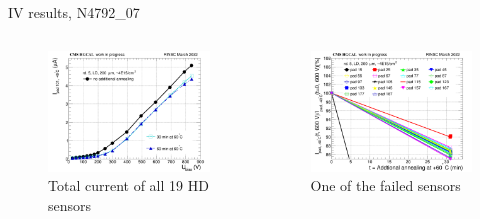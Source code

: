 \documentclass{beamer}
\begin{document}
\begin{frame}{IV results, N4792\_07}
  \begin{columns}
       \begin{figure}
           \includegraphics[width=1.0\textwidth]{plots/annealing_IV_ch101_N4792_7.png}
           \caption{Total current of all 19 HD sensors}
       \end{figure}

       \begin{figure}
           \includegraphics[width=1.0\textwidth]{plots/annealing_current_N4792_7.png}
           \caption{One of the failed sensors}
       \end{figure}
   \end{columns}
\end{frame}
\end{document}
